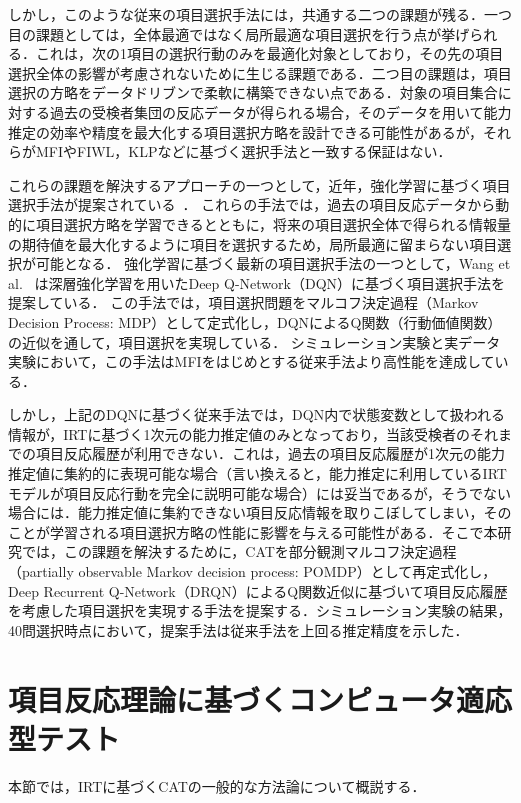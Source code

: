 \documentclass[dvipdfmx,a4j]{jarticle}
\begin{document}
しかし，このような従来の項目選択手法には，共通する二つの課題が残る．一つ目の課題としては，全体最適ではなく局所最適な項目選択を行う点が挙げられる．これは，次の1項目の選択行動のみを最適化対象としており，その先の項目選択全体の影響が考慮されないために生じる課題である．二つ目の課題は，項目選択の方略をデータドリブンで柔軟に構築できない点である．対象の項目集合に対する過去の受検者集団の反応データが得られる場合，そのデータを用いて能力推定の効率や精度を最大化する項目選択方略を設計できる可能性があるが，それらがMFIやFIWL，KLPなどに基づく選択手法と一致する保証はない．

これらの課題を解決するアプローチの一つとして，近年，強化学習に基づく項目選択手法が提案されている~\cite{ghosh2021,nurakhmetov2019,shin2022,wang2024}．
これらの手法では，過去の項目反応データから動的に項目選択方略を学習できるとともに，将来の項目選択全体で得られる情報量の期待値を最大化するように項目を選択するため，局所最適に留まらない項目選択が可能となる．
強化学習に基づく最新の項目選択手法の一つとして，Wang et al.~\cite{wang2024} は深層強化学習を用いたDeep Q-Network（DQN）に基づく項目選択手法を提案している．
この手法では，項目選択問題をマルコフ決定過程（Markov Decision Process: MDP）として定式化し，DQNによるQ関数（行動価値関数）の近似を通して，項目選択を実現している．
シミュレーション実験と実データ実験において，この手法はMFIをはじめとする従来手法より高性能を達成している．

しかし，上記のDQNに基づく従来手法では，DQN内で状態変数として扱われる情報が，IRTに基づく1次元の能力推定値のみとなっており，当該受検者のそれまでの項目反応履歴が利用できない．これは，過去の項目反応履歴が1次元の能力推定値に集約的に表現可能な場合（言い換えると，能力推定に利用しているIRTモデルが項目反応行動を完全に説明可能な場合）には妥当であるが，そうでない場合には．能力推定値に集約できない項目反応情報を取りこぼしてしまい，そのことが学習される項目選択方略の性能に影響を与える可能性がある．そこで本研究では，この課題を解決するために，CATを部分観測マルコフ決定過程（partially observable Markov decision process: POMDP）として再定式化し，Deep Recurrent Q-Network（DRQN）によるQ関数近似に基づいて項目反応履歴を考慮した項目選択を実現する手法を提案する．シミュレーション実験の結果，40問選択時点において，提案手法は従来手法を上回る推定精度を示した．

\section{項目反応理論に基づくコンピュータ適応型テスト}

本節では，IRTに基づくCATの一般的な方法論について概説する．
\end{document}
